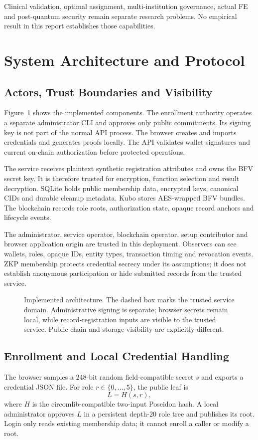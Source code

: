 \documentclass[10pt,twocolumn,a4paper]{article}
\begin{document}
Clinical validation, optimal assignment, multi-institution governance, actual FE
and post-quantum security remain separate research problems. No empirical result
in this report establishes those capabilities.

\section{System Architecture and Protocol}
\label{sec:arch}

\subsection{Actors, Trust Boundaries and Visibility}
Figure~\ref{fig:architecture} shows the implemented components. The enrollment
authority operates a separate administrator CLI and approves only public
commitments. Its signing key is not part of the normal API process. The browser
creates and imports credentials and generates proofs locally. The API validates
wallet signatures and current on-chain authorization before protected operations.

The service receives plaintext synthetic registration attributes and owns the BFV
secret key. It is therefore trusted for encryption, function selection and result
decryption. SQLite holds public membership data, encrypted keys, canonical CIDs
and durable cleanup metadata. Kubo stores AES-wrapped BFV bundles. The blockchain
records role roots, authorization state, opaque record anchors and lifecycle events.

The administrator, service operator, blockchain operator, setup contributor and
browser application origin are trusted in this deployment. Observers can see
wallets, roles, opaque IDs, entity types, transaction timing and revocation events.
ZKP membership protects credential secrecy under its assumptions; it does not
establish anonymous participation or hide submitted records from the trusted service.

\begin{figure}[t]
\centering

\caption{Implemented architecture. The dashed box marks the trusted service domain. Administrative signing is separate; browser secrets remain local, while record-registration inputs are visible to the trusted service. Public-chain and storage visibility are explicitly different.}
\label{fig:architecture}
\end{figure}

\subsection{Enrollment and Local Credential Handling}
The browser samples a 248-bit random field-compatible secret $s$ and exports a
credential JSON file. For role $r\in\{0,\ldots,5\}$, the public leaf is
\begin{equation}
 L=H(s,r),
 \label{eq:leaf}
\end{equation}
where $H$ is the circomlib-compatible two-input Poseidon hash. A local administrator
approves $L$ in a persistent depth-20 role tree and publishes its root. Login only
reads existing membership data; it cannot enroll a caller or modify a root.
\end{document}

